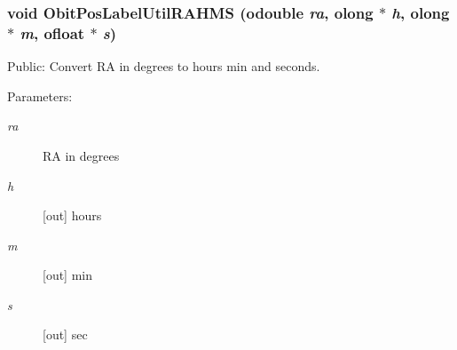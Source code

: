 \subsubsection{\setlength{\rightskip}{0pt plus 5cm}void Obit\-Pos\-Label\-Util\-RAHMS ({\bf odouble} {\em ra}, {\bf olong} $\ast$ {\em h}, {\bf olong} $\ast$ {\em m}, {\bf ofloat} $\ast$ {\em s})}\label{ObitPosLabelUtil_8h_a3}


Public: Convert RA in degrees to hours min and seconds. 

\begin{Desc}
\item[Parameters:]
\begin{description}
\item[{\em ra}]RA in degrees \item[{\em h}][out] hours \item[{\em m}][out] min \item[{\em s}][out] sec \end{description}
\end{Desc}
